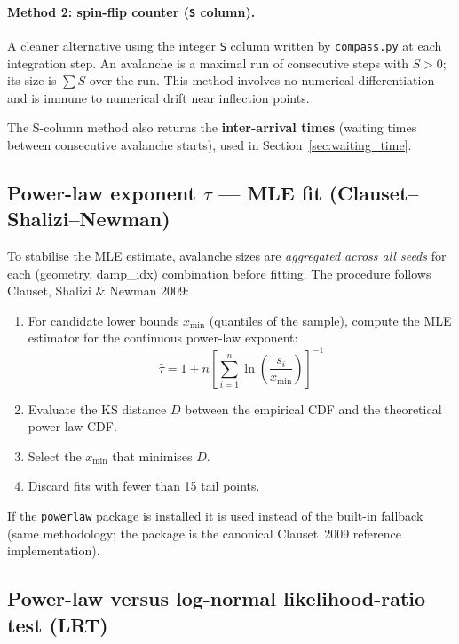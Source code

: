 \documentclass[11pt,a4paper]{article}
\begin{document}
\paragraph{Method 2: spin-flip counter (\texttt{S} column).}
A cleaner alternative using the integer \texttt{S} column written by
\texttt{compass.py} at each integration step.  An avalanche is a maximal run
of consecutive steps with $S > 0$; its size is $\sum S$ over the run.
This method involves no numerical differentiation and is immune to numerical
drift near inflection points.

The S-column method also returns the \textbf{inter-arrival times}
(waiting times between consecutive avalanche starts), used in
Section~\ref{sec:waiting_time}.

\subsection{Power-law exponent $\tau$ --- MLE fit (Clauset--Shalizi--Newman)}

To stabilise the MLE estimate, avalanche sizes are \textit{aggregated across
all seeds} for each (geometry, damp\_idx) combination before fitting.  The
procedure follows Clauset, Shalizi \& Newman 2009:

\begin{enumerate}
  \item For candidate lower bounds $x_{\min}$ (quantiles of the sample), compute
    the MLE estimator for the continuous power-law exponent:
    \begin{equation}
      \hat{\tau} = 1 + n\left[\sum_{i=1}^n \ln\!\left(\frac{s_i}{x_{\min}}\right)\right]^{-1}
    \end{equation}
  \item Evaluate the KS distance $D$ between the empirical CDF and the
    theoretical power-law CDF.
  \item Select the $x_{\min}$ that minimises $D$.
  \item Discard fits with fewer than 15 tail points.
\end{enumerate}

If the \texttt{powerlaw} package is installed it is used instead of the
built-in fallback (same methodology; the package is the canonical
Clauset~2009 reference implementation).

\subsection{Power-law versus log-normal likelihood-ratio test (LRT)}
\label{sec:lrt}
\end{document}
